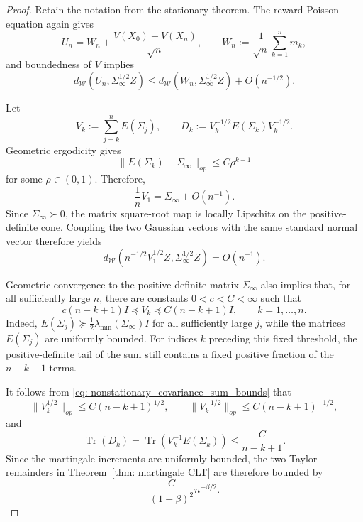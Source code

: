 \documentclass[10pt,a4paper]{article}
\begin{document}
\begin{proof}
Retain the notation from the stationary theorem. The reward Poisson
equation again gives
\[
U_n=W_n+\frac{V(X_0)-V(X_n)}{\sqrt n},
\qquad
W_n:=\frac1{\sqrt n}\sum_{k=1}^n m_k,
\]
and boundedness of $V$ implies
\[
d_{\mathcal W}(U_n,\Sigma_\infty^{1/2}Z)
\leq
d_{\mathcal W}(W_n,\Sigma_\infty^{1/2}Z)+O(n^{-1/2}).
\]

Let
\[
V_k:=\sum_{j=k}^nE(\Sigma_j),
\qquad
D_k:=V_k^{-1/2}E(\Sigma_k)V_k^{-1/2}.
\]
Geometric ergodicity gives
\[
\|E(\Sigma_k)-\Sigma_\infty\|_{op}
\leq
C\rho^{k-1}
\]
for some $\rho\in(0,1)$. Therefore,
\[
\frac1nV_1
=
\Sigma_\infty+O(n^{-1}).
\]
Since $\Sigma_\infty\succ0$, the matrix square-root map is locally
Lipschitz on the positive-definite cone. Coupling the two Gaussian
vectors with the same standard normal vector therefore yields
\[
d_{\mathcal W}
\left(
n^{-1/2}V_1^{1/2}Z,
\Sigma_\infty^{1/2}Z
\right)
=
O(n^{-1}).
\]

Geometric convergence to the positive-definite matrix
$\Sigma_\infty$ also implies that, for all sufficiently large $n$,
there are constants $0<c<C<\infty$ such that
\begin{equation}
\label{eq: nonstationary_covariance_sum_bounds}
c(n-k+1)I
\preceq
V_k
\preceq
C(n-k+1)I,
\qquad
k=1,\ldots,n.
\end{equation}
Indeed, $E(\Sigma_j)\succeq
\frac12\lambda_{\min}(\Sigma_\infty)I$ for all sufficiently large
$j$, while the matrices $E(\Sigma_j)$ are uniformly bounded. For
indices $k$ preceding this fixed threshold, the positive-definite
tail of the sum still contains a fixed positive fraction of the
$n-k+1$ terms.

It follows from
\eqref{eq: nonstationary_covariance_sum_bounds} that
\[
\|V_k^{1/2}\|_{op}
\leq
C(n-k+1)^{1/2},
\qquad
\|V_k^{-1/2}\|_{op}
\leq
C(n-k+1)^{-1/2},
\]
and
\[
\operatorname{Tr}(D_k)
=
\operatorname{Tr}(V_k^{-1}E(\Sigma_k))
\leq
\frac{C}{n-k+1}.
\]
Since the martingale increments are uniformly bounded, the two
Taylor remainders in Theorem~\ref{thm: martingale CLT} are therefore
bounded by
\[
\frac{C}{(1-\beta)^2}n^{-\beta/2}.
\]


\end{proof}
\end{document}
